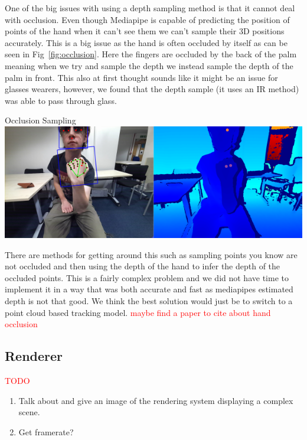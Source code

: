 One of the big issues with using a depth sampling method is that it cannot deal with occlusion. Even though Mediapipe is capable of predicting the position of points of the hand when it can't see them we can't sample their 3D positions accurately. This is a big issue as the hand is often occluded by itself as can be seen in Fig~\ref{fig:occlusion}. Here the fingers are occluded by the back of the palm meaning when we try and sample the depth we instead sample the depth of the palm in front. This also at first thought sounds like it might be an issue for glasses wearers, however, we found that the depth sample (it uses an IR method) was able to pass through glass. \\ 

\begin{figureBox}[label={fig:occlusion}, width=1.0\linewidth]{Occlusion Sampling}
	\includegraphics[width = 1.0\linewidth]{./evaluation/figures/occulusionsampling.png}
\end{figureBox}

There are methods for getting around this such as sampling points you know are not occluded and then using the depth of the hand to infer the depth of the occluded points. This is a fairly complex problem and we did not have time to implement it in a way that was both accurate and fast as mediapipes estimated depth is not that good. We think the best solution would just be to switch to a point cloud based tracking model. \textcolor{red}{maybe find a paper to cite about hand occlusion}

\subsection{Renderer}
\textcolor{red}{TODO}
\begin{enumerate}
	\item Talk about and give an image of the rendering system displaying a complex scene.
	\item Get framerate?
\end{enumerate}

